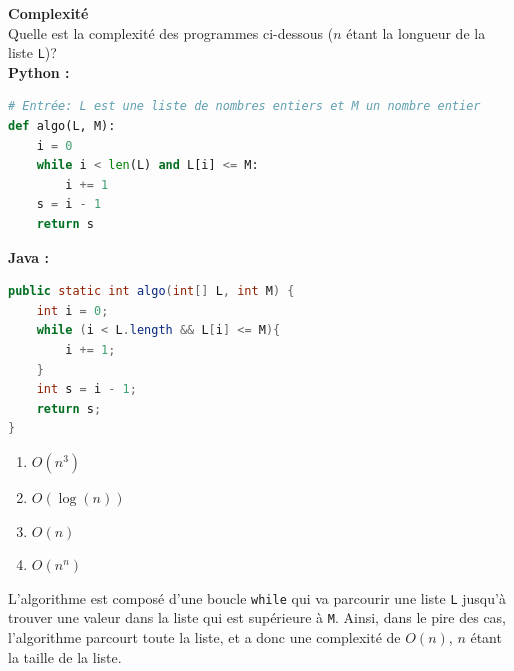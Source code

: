 \begin{Exercice}[10 minutes] \textbf{Complexité} \\
    Quelle est la complexité des programmes ci-dessous ($n$ étant la longueur de la liste \texttt{L})?\\
    \textbf{Python :}
    \begin{lstlisting}[language=Python]
# Entrée: L est une liste de nombres entiers et M un nombre entier
def algo(L, M):
    i = 0
    while i < len(L) and L[i] <= M:
        i += 1
    s = i - 1
    return s
    \end{lstlisting}
    
    \textbf{Java :}
    \begin{lstlisting}[language=Java]
public static int algo(int[] L, int M) {
    int i = 0;
    while (i < L.length && L[i] <= M){
        i += 1;
    }
    int s = i - 1;
    return s;
}
    \end{lstlisting}

    \begin{enumerate}
        \item $O(n^3)$
        \item $O(\log(n))$
        \item $O(n)$
        \item $O(n^n)$
    \end{enumerate}

    \begin{solution}
    L'algorithme est composé d'une boucle \lstinline{while} qui va parcourir une liste \lstinline{L} jusqu'à trouver une valeur dans la liste qui est supérieure à \lstinline{M}. Ainsi, dans le pire des cas, l'algorithme parcourt toute la liste, et a donc une complexité de $O(n)$, $n$ étant la taille de la liste.
    \end{solution}
\end{Exercice}
